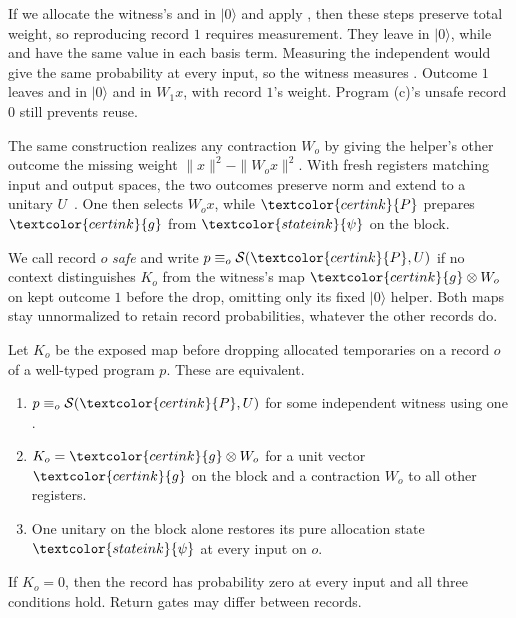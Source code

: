 \documentclass[acmsmall,11pt,screen,review,anonymous,nonacm]{acmart}
\begin{document}
If we allocate the witness's  and  in $|0\rangle$ and apply , then these steps
preserve total weight, so reproducing record $1$ requires measurement. They leave  in
$|0\rangle$, while  and  have the same value in each basis term. Measuring the independent
 would give the same probability at every input, so the witness measures . Outcome $1$ leaves
 and  in $|0\rangle$ and  in $W_1x$, with record $1$'s weight.
Program (c)'s unsafe record $0$ still prevents reuse.

The same construction realizes any contraction $W_o$ by giving the helper's other outcome the missing
weight $\|x\|^2-\|W_ox\|^2$. With fresh registers matching input and output spaces, the two outcomes
preserve norm and extend to a unitary $U$~\cite[Thm.~2]{Robinson2018Julia}. One  then selects
$W_ox$, while $\textcolor{certink}{P}$ prepares $\textcolor{certink}{g}$ from $\textcolor{stateink}{\psi}$ on the block.

We call record $o$ \emph{safe} and write $p\equiv_o\mathcal S(\textcolor{certink}{P},U)$ if no context distinguishes $K_o$ from the
witness's map $\textcolor{certink}{g}\otimes W_o$ on kept outcome $1$ before the drop, omitting only its fixed $|0\rangle$ helper.
Both maps stay unnormalized to retain record probabilities, whatever the other records do.

\begin{theorem}\label{thm:perrecord}
Let $K_o$ be the exposed map before dropping allocated temporaries on a record $o$ of a well-typed
program $p$. These are equivalent.
\begin{enumerate}[leftmargin=1.6em,itemsep=1pt,topsep=2pt,parsep=0pt]
\item $p\equiv_o\mathcal S(\textcolor{certink}{P},U)$ for some independent witness using one .
\item $K_o=\textcolor{certink}{g}\otimes W_o$ for a unit vector $\textcolor{certink}{g}$ on the block and a contraction $W_o$ to all
other registers.
\item One unitary on the block alone restores its pure allocation state
$\textcolor{stateink}{\psi}$ at every input on $o$.
\end{enumerate}
If $K_o=0$, then the record has probability zero at every input and all three conditions hold.
Return gates may differ between records.
\end{theorem}
\end{document}
